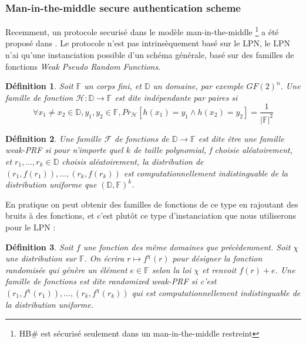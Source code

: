 \documentclass{article}		%
\newtheorem{defi}{Définition}
\theoremstyle{definition}
\theoremstyle{plain}
\theoremstyle{plain}
\theoremstyle{plain}
\theoremstyle{plain}
\theoremstyle{plain}
\begin{document}
\subsubsection{Man-in-the-middle secure authentication scheme}
Recemment, un protocole securisé dans le modèle man-in-the-middle
\footnote{HB\# est sécurisé seulement dans un man-in-the-middle
restreint} a été
proposé dans \cite{Lyu}. Le protocole n'est pas intrinsèquement basé sur le LPN, le LPN
n'ai qu'une instanciation possible d'un schéma générale, basé sur des
familles de fonctions \emph{Weak Pseudo Random Functions}.
\begin{defi}
Soit $\mathbb{F}$ un corps fini, et $\mathbb{D}$ un domaine, par exemple
$GF(2)^n$.
Une famille de fonction $\mathcal{H}: \mathbb{D}\rightarrow \mathbb{F}$ est dite indépendante par paires si 
$$\forall x_1 \not= x_2\in \mathbb{D}, y_1, y_2 \in \mathbb{F},
Pr_\mathcal{H}[h(x_1)=y_1 \wedge h(x_2)=y_2]=\frac{1}{|\mathbb{F}|^2}$$
\end{defi}

\begin{defi}
Une famille $\mathcal{F}$ de fonctions de
$\mathbb{D}\rightarrow\mathbb{F}$ est dite être une famille weak-PRF si
pour n'importe quel $k$ de taille polynomial, f choisie aléatoirement, et
$r_1,\dots,r_k\in\mathbb{D}$ choisis aléatoirement, la distribution de
$(r_1,f(r_1)),\dots,(r_k,f(r_k))$ est computationnellement indistinguable
de la distribution uniforme que $(\mathbb{D},\mathbb{F})^k$.
\end{defi}

En pratique on peut obtenir des familles de fonctions de ce type en rajoutant des
bruits à des fonctions, et c'est plutôt ce type d'instanciation que nous
utiliserons pour le LPN :
\begin{defi}
Soit $f$ une fonction des même domaines que précèdemment. Soit $\chi$ une
distribution sur $\mathbb{F}$. On écrira $r\mapsto f^\chi(r)$ pour désigner la
fonction randomisée qui génère un élément $e\in\mathbb{F}$ selon la loi
$\chi$ et renvoit $f(r)+e$. Une famille de fonctions est dite \emph{randomized
weak-PRF} si c'est $(r_1,f^\chi(r_1)),\dots,(r_k,f^\chi(r_k))$ qui est
computationnellement indistinguable de la distribution uniforme.
\end{defi}
\end{document}
